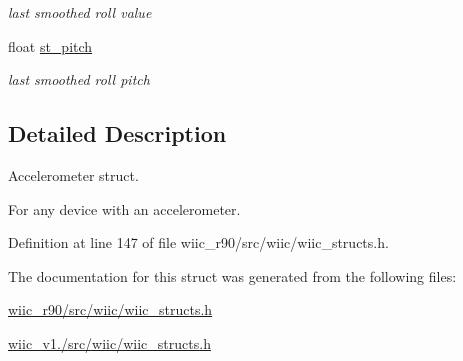 \begin{DoxyCompactItemize}
\begin{DoxyCompactList}\small\item\em last smoothed roll value \end{DoxyCompactList}\item 
\hypertarget{structaccel__t_a51fc3bf1711ae77691f8e71f307b913d}{float \hyperlink{structaccel__t_a51fc3bf1711ae77691f8e71f307b913d}{st\-\_\-pitch}}\label{structaccel__t_a51fc3bf1711ae77691f8e71f307b913d}

\begin{DoxyCompactList}\small\item\em last smoothed roll pitch \end{DoxyCompactList}\end{DoxyCompactItemize}


\subsection{Detailed Description}
Accelerometer struct. 

For any device with an accelerometer. 

Definition at line 147 of file wiic\-\_\-r90/src/wiic/wiic\-\_\-structs.\-h.



The documentation for this struct was generated from the following files\-:\begin{DoxyCompactItemize}
\item 
\hyperlink{wiic__r90_2src_2wiic_2wiic__structs_8h}{wiic\-\_\-r90/src/wiic/wiic\-\_\-structs.\-h}\item 
\hyperlink{wiic__v1_81_2src_2wiic_2wiic__structs_8h}{wiic\-\_\-v1./src/wiic/wiic\-\_\-structs.\-h}\end{DoxyCompactItemize}
